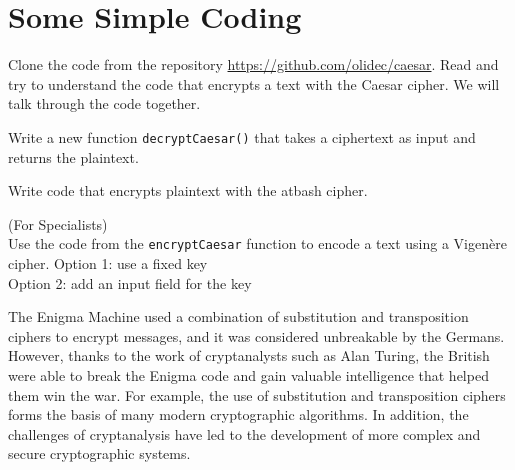\documentclass[11pt,a4paper]{report}
\begin{document}
\section{Some Simple Coding}

\begin{ex}
Clone the code from the repository \url{https://github.com/olidec/caesar}.
Read and try to understand the code that encrypts a text with the Caesar cipher.
We will talk through the code together.
\end{ex}

\begin{ex}
Write a new function \verb|decryptCaesar()|
that takes a ciphertext as input and returns the plaintext.
\end{ex}

\begin{ex}
Write code that encrypts plaintext with the atbash cipher. 
\end{ex}

\begin{ex}
(For Specialists) \\
Use the code from the \verb|encryptCaesar| function to encode a text using a Vigen\`ere cipher.
Option 1: use a fixed key \\
Option 2: add an input field for the key
\end{ex}



%
The Enigma Machine used a combination of substitution and transposition ciphers to encrypt messages, and it was considered unbreakable by the Germans.
However, thanks to the work of cryptanalysts such as Alan Turing, the British were able to break the Enigma code and gain valuable intelligence that helped them win the war.
%
For example, the use of substitution and transposition ciphers forms the basis of many modern cryptographic algorithms.
In addition, the challenges of cryptanalysis have led to the development of more complex and secure cryptographic systems.
\end{document}
